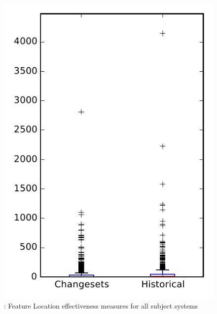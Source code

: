 
\begin{figure}
\centering
\includegraphics[height=0.4\textheight]{figures/flt/rq2_overview}
\caption{\ftwo: Feature Location effectiveness measures for all subject systems}
\label{fig:flt:rq2:overview}
\end{figure}
